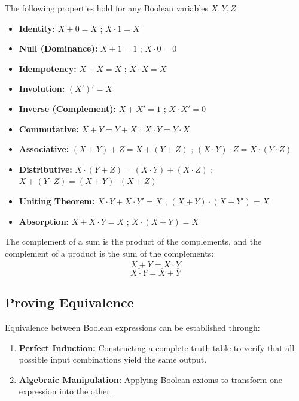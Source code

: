 \begin{theorem}
The following properties hold for any Boolean variables $X, Y, Z$:
\begin{itemize}
    \item \textbf{Identity:} $X + 0 = X$ ; $X \cdot 1 = X$
    \item \textbf{Null (Dominance):} $X + 1 = 1$ ; $X \cdot 0 = 0$
    \item \textbf{Idempotency:} $X + X = X$ ; $X \cdot X = X$
    \item \textbf{Involution:} $(X')' = X$
    \item \textbf{Inverse (Complement):} $X + X' = 1$ ; $X \cdot X' = 0$
    \item \textbf{Commutative:} $X + Y = Y + X$ ; $X \cdot Y = Y \cdot X$
    \item \textbf{Associative:} $(X + Y) + Z = X + (Y + Z)$ ; $(X \cdot Y) \cdot Z = X \cdot (Y \cdot Z)$
    \item \textbf{Distributive:} $X \cdot (Y + Z) = (X \cdot Y) + (X \cdot Z)$ ; $X + (Y \cdot Z) = (X + Y) \cdot (X + Z)$
    \item \textbf{Uniting Theorem:} $X \cdot Y + X \cdot Y' = X$ ; $(X + Y) \cdot (X + Y') = X$
    \item \textbf{Absorption:} $X + X \cdot Y = X$ ; $X \cdot (X + Y) = X$
\end{itemize}
\end{theorem}

\begin{proposition}
The complement of a sum is the product of the complements, and the complement of a product is the sum of the complements:
\begin{equation}
\overline{X + Y} = \overline{X} \cdot \overline{Y}
\end{equation}
\begin{equation}
\overline{X \cdot Y} = \overline{X} + \overline{Y}
\end{equation}
\end{proposition}

\subsection{Proving Equivalence}
Equivalence between Boolean expressions can be established through:
\begin{enumerate}
    \item \textbf{Perfect Induction:} Constructing a complete truth table to verify that all possible input combinations yield the same output.
    \item \textbf{Algebraic Manipulation:} Applying Boolean axioms to transform one expression into the other.
\end{enumerate}

